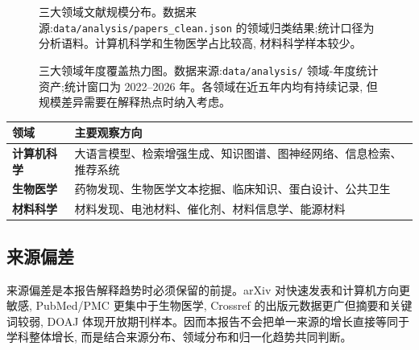 \begin{figure}[!htbp]
  \centering
  \caption{三大领域文献规模分布。数据来源:\texttt{data/analysis/papers\_clean.json} 的领域归类结果;统计口径为分析语料。计算机科学和生物医学占比较高, 材料科学样本较少。}
  \label{fig:field-distribution}
\end{figure}

\begin{figure}[!htbp]
  \centering
  \caption{三大领域年度覆盖热力图。数据来源:\texttt{data/analysis/} 领域-年度统计资产;统计窗口为 2022--2026 年。各领域在近五年内均有持续记录, 但规模差异需要在解释热点时纳入考虑。}
  \label{fig:field-year-heatmap}
\end{figure}

\begin{tableblock}
\begin{tabularx}{\textwidth}{>{\bfseries}p{32mm}X}
\toprule
领域 & 主要观察方向 \\
\midrule
计算机科学 & 大语言模型、检索增强生成、知识图谱、图神经网络、信息检索、推荐系统 \\
生物医学 & 药物发现、生物医学文本挖掘、临床知识、蛋白设计、公共卫生 \\
材料科学 & 材料发现、电池材料、催化剂、材料信息学、能源材料 \\
\bottomrule
\end{tabularx}
\end{tableblock}

\subsection{来源偏差}

来源偏差是本报告解释趋势时必须保留的前提。arXiv 对快速发表和计算机方向更敏感, PubMed/PMC 更集中于生物医学, Crossref 的出版元数据更广但摘要和关键词较弱, DOAJ 体现开放期刊样本。因而本报告不会把单一来源的增长直接等同于学科整体增长, 而是结合来源分布、领域分布和归一化趋势共同判断。

\clearpage
